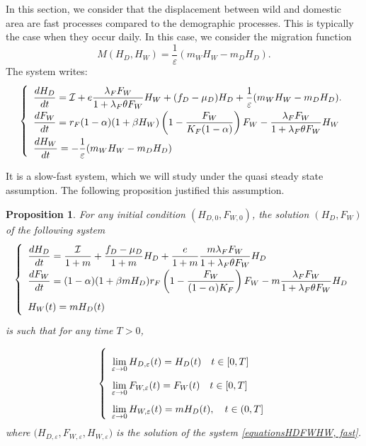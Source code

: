 \documentclass{article}
\newcommand{\lfw}{\lambda_{F}}
\newcommand{\lfw}{\lambda_{F}}
\newcommand{\cI}{\mathcal{I}}
\renewcommand{\epsilon}{\varepsilon}
\newtheorem{prop}{Proposition}
\begin{document}
In this section, we consider that the displacement between wild and domestic area are fast processes compared to the demographic processes. This is typically the case when they occur daily. In this case, we consider the migration function
$$
M(H_D, H_W)  = \dfrac{1}{\epsilon}(m_W H_W - m_D H_D).
$$
The system writes:
\begin{equation}
\def\arraystretch{2}
\left\{ 
\begin{array}{l}
\dfrac{dH_D}{dt}= \cI + e\dfrac{\lfw F_W}{1 + \lfw \theta F_W}H_W + (f_D - \mu_D) H_D + \dfrac{1}{\epsilon}(m_W H_W - m_D H_D). \\
\dfrac{dF_W}{dt} = r_F(1- \alpha) (1+ \beta H_W) \left(1 - \dfrac{F_W}{K_F(1-\alpha)} \right) F_W - \dfrac{\lfw F_W}{1 + \lfw \theta F_W} H_W \\
\dfrac{dH_W}{dt}= - \dfrac{1}{\epsilon}(m_W H_W - m_D H_D)
\end{array} \right.
\label{equationsHDFWHW, fast}
\end{equation}

It is a slow-fast system, which we will study under the quasi steady state assumption. The following proposition justified this assumption.

\begin{prop} 


For any initial condition $(H_{D,0}, F_{W, 0})$, the solution $(H_D, F_W)$  of the following system
\begin{equation}
\def\arraystretch{2}
\left\lbrace \begin{array}{l}
\dfrac{dH_D}{dt} = \dfrac{\cI}{1+m} + \dfrac{f_D - \mu_D}{1+m} H_D + \dfrac{e }{1+m} \dfrac{m \lfw F_W}{1 + \lfw \theta F_W}H_D \\
\dfrac{dF_W}{dt} = (1-\alpha) (1+\beta m H_D) r_F \left(1 - \dfrac{F_W}{(1-\alpha)K_F} \right) F_W - m \dfrac{\lfw F_W}{1 + \lfw \theta F_W} H_D \\
H_W(t) = m H_D(t)
\end{array} \right.
\label{QSSA}
\end{equation} is such that for any time $T > 0$, 

\begin{equation}
\def\arraystretch{2}
\left\lbrace \begin{array}{l}
\lim\limits_{ \epsilon \rightarrow 0}{H_{D, \epsilon}(t)} = H_D(t) \quad t \in [0,T] \\
\lim\limits_{ \epsilon \rightarrow 0} F_{W,  \epsilon}(t) = F_W(t)\quad t \in [0,T] \\
 \lim\limits_{ \epsilon \rightarrow 0} H_{W,  \epsilon}(t) = m H_D(t), \quad  t\in (0,T] \\
\end{array} \right.
\end{equation}
where $\Big(H_{D, \epsilon}, F_{W,  \epsilon}, H_{W,  \epsilon} \Big)$ is the solution of the system \eqref{equationsHDFWHW, fast}.

\end{prop}
\end{document}
